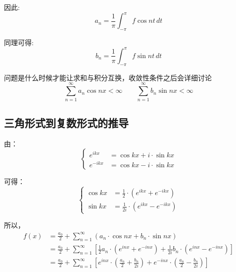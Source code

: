 \documentclass[12pt,a4paper]{article}
\numberwithin{subsection}{section}   %
\numberwithin{subsubsection}{subsection}
\theoremstyle{plain}
\theoremstyle{definition}
\theoremstyle{remark}
\theoremstyle{remark}
\begin{document}
因此:
\begin{equation}
	a_n = \frac{1}{\pi} \int_{-\pi}^{\pi} f \cos nt \, dt
\end{equation}

同理可得:
\begin{equation}
	b_n = \frac{1}{\pi} \int_{-\pi}^{\pi} f \sin nt \, dt
\end{equation}

问题是什么时候才能让求和与积分互换，收敛性条件之后会详细讨论
\begin{equation}
	\sum_{n=1}^{\infty} a_n \cos nx < \infty \qquad \sum_{n=1}^{\infty} b_n \sin nx < \infty
\end{equation}



\subsection{三角形式到复数形式的推导}
由：
\begin{equation}
	\left\{
	\begin{aligned}
		e^{ikx} &= \cos kx + i \cdot \sin kx \\[8pt]
		e^{-ikx} &= \cos kx - i \cdot \sin kx
	\end{aligned}
	\right.
\end{equation}

可得：
\begin{equation}
\left\{
\begin{aligned}
	\cos kx &= \frac{1}{2} \cdot (e^{ikx} + e^{-ikx}) \\[8pt]
	\sin kx &= \frac{1}{2i} \cdot (e^{ikx} - e^{-ikx})
\end{aligned}
\right.
\end{equation}

所以，
\begin{equation}
	\begin{aligned}
		f(x) &= \frac{a_0}{2} + \sum_{n=1}^{\infty} (a_n \cdot \cos nx + b_n \cdot \sin nx) \\[8pt]
		&= \frac{a_0}{2} + \sum_{n=1}^{\infty} \left[ \frac{1}{2} a_n \cdot (e^{inx} + e^{-inx}) + \frac{1}{2i} b_n \cdot (e^{inx} - e^{-inx}) \right] \\[8pt]
		&= \frac{a_0}{2} + \sum_{n=1}^{\infty} \left[ e^{inx} \cdot \left( \frac{a_n}{2} + \frac{b_n}{2i} \right) + e^{-inx} \cdot \left( \frac{a_n}{2} - \frac{b_n}{2i} \right) \right]
	\end{aligned}
\end{equation}
 
\end{document}
